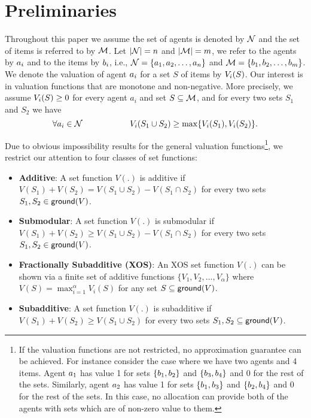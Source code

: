 \section{Preliminaries}\label{prelim}

Throughout this paper we assume the set of agents is denoted by $\mathcal{N}$ and the set of items is referred to by $\mathcal{M}$. Let $|\mathcal{N}| = n$ and $|\mathcal{M}| = m$, we refer to the agents by $a_i$ and to the items by $b_i$, i.e., $\mathcal{N} = \{a_1, a_2, \ldots, a_n\}$ and $\mathcal{M} = \{b_1, b_2, \ldots,b_m\}$. We denote the valuation of agent $a_i$ for a set $S$ of items by $V_i(S)$. Our interest is in valuation functions that are monotone and non-negative. More precisely, we assume $V_i(S) \geq 0$ for every agent $a_i$ and set $S \subseteq \mathcal{M}$, and for every two sets $S_1$ and $S_2$ we have
$$\forall a_i \in \mathcal{N}\hspace{2cm} V_i(S_1 \cup S_2) \geq \max\{V_i(S_1), V_i(S_2)\}.$$

Due to obvious impossibility results for the general valuation functions\footnote{If the valuation functions are not restricted, no approximation guarantee can be achieved. For instance consider the case where we have two agents and 4 items. Agent $a_1$ has value 1 for sets $\{b_1,b_2\}$ and $\{b_3,b_4\}$ and 0 for the rest of the sets. Similarly, agent $a_2$ has value 1 for sets $\{b_1,b_3\}$ and $\{b_2,b_4\}$ and 0 for the rest of the sets. In this case, no allocation can provide both of the agents with sets which are of non-zero value to them.}, we restrict our attention to four classes of set functions:
\begin{itemize}
	\item \textbf{Additive}: A set function $V(.)$ is additive if $V(S_1) + V(S_2) = V(S_1 \cup S_2) - V(S_1 \cap S_2)$ for every two sets $S_1,S_2 \in \mathsf{ground}(V)$.
	\item \textbf{Submodular}: A set function $V(.)$ is submodular if $V(S_1) + V(S_2) \geq V(S_1 \cup S_2) - V(S_1 \cap S_2)$ for every two sets $S_1,S_2 \in \mathsf{ground}(V)$.
	\item \textbf{Fractionally Subadditive (XOS)}: An XOS set function $V(.)$ can be shown via a finite set of additive functions $\{V_1, V_2, \ldots, V_{\alpha}\}$ where $V(S) = \max_{i=1}^{\alpha} V_i(S)$ for any set $S \subseteq \mathsf{ground}(V)$. 
	\item \textbf{Subadditive}: A set function $V(.)$ is subadditive if $V(S_1) + V(S_2) \geq V(S_1 \cup S_2)$ for every two sets $S_1,S_2 \subseteq \mathsf{ground}(V)$. 
\end{itemize}

